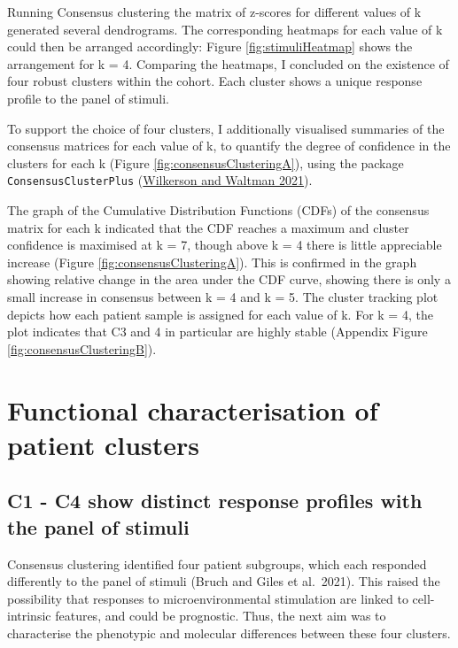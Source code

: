 \documentclass[11pt, a4paper, twosided]{book}
\begin{document}
Running Consensus clustering the matrix of z-scores for different values of k generated several dendrograms. The corresponding heatmaps for each value of k could then be arranged accordingly: Figure \ref{fig:stimuliHeatmap} shows the arrangement for k = 4. Comparing the heatmaps, I concluded on the existence of four robust clusters within the cohort. Each cluster shows a unique response profile to the panel of stimuli.

To support the choice of four clusters, I additionally visualised summaries of the consensus matrices for each value of k, to quantify the degree of confidence in the clusters for each k (Figure \ref{fig:consensusClusteringA}), using the package \texttt{ConsensusClusterPlus} (\protect\hyperlink{ref-R-ConsensusClusterPlus}{Wilkerson and Waltman 2021}).

The graph of the Cumulative Distribution Functions (CDFs) of the consensus matrix for each k indicated that the CDF reaches a maximum and cluster confidence is maximised at k = 7, though above k = 4 there is little appreciable increase (Figure \ref{fig:consensusClusteringA}). This is confirmed in the graph showing relative change in the area under the CDF curve, showing there is only a small increase in consensus between k = 4 and k = 5. The cluster tracking plot depicts how each patient sample is assigned for each value of k. For k = 4, the plot indicates that C3 and 4 in particular are highly stable (Appendix Figure \ref{fig:consensusClusteringB}).

\hypertarget{functional-characterisation-of-patient-clusters}{%
\section{Functional characterisation of patient clusters}\label{functional-characterisation-of-patient-clusters}}

\hypertarget{cluster-responses}{%
\subsection{C1 - C4 show distinct response profiles with the panel of stimuli}\label{cluster-responses}}

Consensus clustering identified four patient subgroups, which each responded differently to the panel of stimuli (Bruch and Giles et al.~2021). This raised the possibility that responses to microenvironmental stimulation are linked to cell-intrinsic features, and could be prognostic. Thus, the next aim was to characterise the phenotypic and molecular differences between these four clusters.
\end{document}
